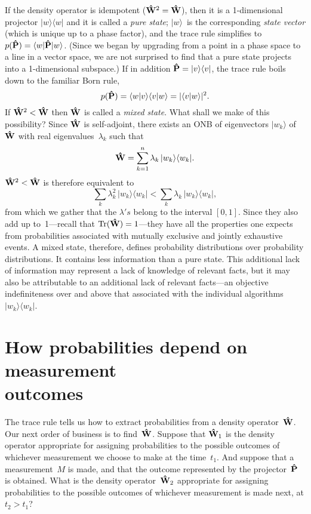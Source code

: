 \documentclass[12pt]{article}
\newcommand{\ket}[1]{\vert#1\rangle}
\newcommand{\braket}[2]{\langle#1\vert#2\rangle}
\newcommand{\ketbra}[2]{\vert#1\rangle\langle#2\vert}
\newcommand{\sandwich}[3]{\langle#1\vert#2\vert#3\rangle}
\newcommand{\Tr}{\hbox{Tr}}
\newcommand{\be}{\begin{equation}}
\newcommand{\ee}{\end{equation}}
\newcommand{\hP}{{\bf\hat P}}
\newcommand{\hW}{{\bf\hat W}}
\begin{document}
If the density operator is idempotent ($\hW^2=\hW$), then it is a 1-dimensional projector $\ketbra ww$ and it is called a \textit{pure state}; $\ket w$~is the corresponding \textit{state vector} (which is unique up to a phase factor), and the trace rule simplifies to $p(\hP)=\sandwich w{\hP}w$. (Since we began by upgrading from a point in a phase space to a line in a vector space, we are not surprised to find that a pure state projects into a 1-dimensional subspace.) If in addition $\hP=\ketbra vv$, the trace rule boils down to the familiar Born rule,
\be
p(\hP)=\braket wv\braket vw=|\braket vw|^2.
\label{EQBorn}
\ee
If $\hW^2<\hW$ then $\hW$ is called a \textit{mixed state}. What shall we make of this possibility? Since $\hW$ is self-adjoint, there exists an ONB of eigenvectors $\ket{w_k}$ of $\hW$ with real eigenvalues~$\lambda_k$ such that
\be
\hW=\sum_{k=1}^n\lambda_k\,\ketbra{w_k}{w_k}.
\ee
$\hW^2<\hW$ is therefore equivalent to
\be
\sum_k\lambda_k^2\,\ketbra{w_k}{w_k}<\sum_k\lambda_k\,\ketbra{w_k}{w_k},
\label{EQWspec}
\ee
from which we gather that the $\lambda's$ belong to the interval $[0,1]$. Since they also add up to~1---recall that $\Tr(\hW)=1$---they have all the properties one expects from probabilities associated with mutually exclusive and jointly exhaustive events. A mixed state, therefore, defines probability distributions over probability distributions. It contains less information than a pure state. This additional lack of information may represent a lack of knowledge of relevant facts, but it may also be attributable to an additional lack of relevant facts---an objective indefiniteness over and above that associated with the individual algorithms $\ketbra{w_k}{w_k}$.

\section{How probabilities depend on measurement\\
outcomes}
\label{SecHowOutcomes}The trace rule tells us how to extract probabilities from a density operator~$\hW$. Our next order of business is to find~$\hW$. Suppose that $\hW_1$ is the density operator appropriate for assigning probabilities to the possible outcomes of whichever measurement we choose to make at the time~$t_1$. And suppose that a measurement~$M$ is made, and that the outcome represented by the projector~$\hP$ is obtained. What is the density operator~$\hW_2$ appropriate for assigning probabilities to the possible outcomes of whichever measurement is made next, at $t_2>t_1$?
\end{document}
